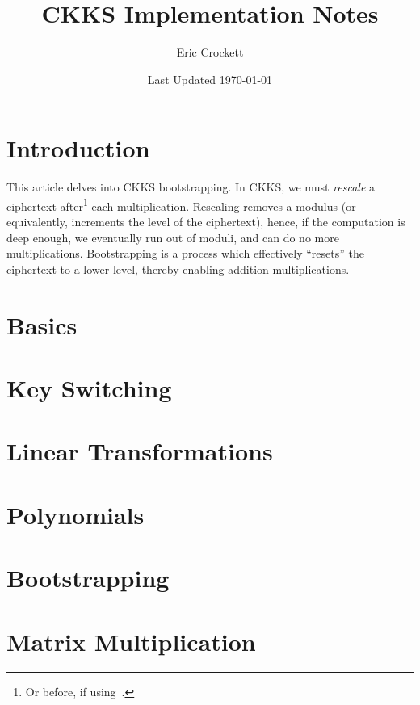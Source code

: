 \documentclass[oneside]{book}
\title{CKKS Implementation Notes}
\author{Eric Crockett}
\date{Last Updated \today}
\newif\ifcompileasbook
\begin{document}
	\hypersetup{pageanchor=false}
	\compileasbooktrue
	\maketitle
	\hypersetup{pageanchor=true}
	\tableofcontents
	
	\chapter{Introduction}
	This article delves into CKKS bootstrapping. In CKKS, we must \emph{rescale} a ciphertext after\footnote{Or before, if using~\cite{cryptoeprint:2020/1118}.} each multiplication. Rescaling removes a modulus (or equivalently, increments the level of the ciphertext), hence, if the computation is deep enough, we eventually run out of moduli, and can do no more multiplications. Bootstrapping is a process which effectively ``resets'' the ciphertext to a lower level, thereby enabling addition multiplications. 

	\chapter{Basics}
	
	
	\chapter{Key Switching}
	
	
	\chapter{Linear Transformations}
	\label{ch:lineartransforms}
	
	
	\chapter{Polynomials}
	\label{ch:polyeval}
	
	
	
	\chapter{Bootstrapping}
	\label{ch:bootstrapping}
	

        \chapter{Matrix Multiplication}
        
	
\end{document}
